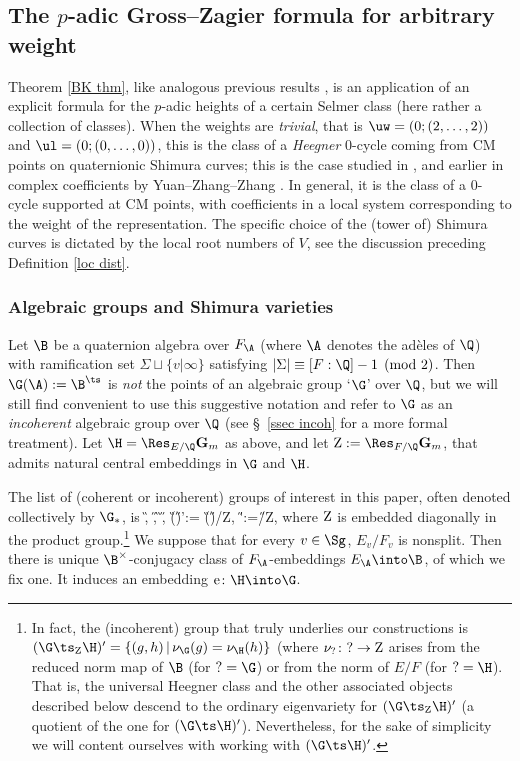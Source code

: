 \subsection{The $p$-adic Gross--Zagier formula for arbitrary weight} \label{sec: GZ}
Theorem \ref{BK thm}, like analogous previous results \cite{pr,nek-heeg,dd-ant,shnidman,dd-pyzz,nonsplit}, is an application of an explicit formula for the $p$-adic heights of a certain Selmer class (here rather a collection of classes). When the weights are \emph{trivial}, that is $\uw=(0; (2,\ldots, 2))$ and $\ul=(0; (0, \ldots, 0))$, this is the class of a \emph{Heegner} $0$-cycle coming from   CM points on quaternionic   Shimura curves; this is the case studied in \cite{dd-pyzz,nonsplit}, and earlier  in complex coefficients by Yuan--Zhang--Zhang \cite{yzz}.
 In general, it is the class of a   $0$-cycle supported at CM points,  with coefficients in a local system corresponding to the weight of the representation. The specific choice of the (tower of) Shimura curves is dictated by the local root numbers of $V$, see the discussion preceding Definition \ref{loc dist}.



\subsubsection{Algebraic groups and Shimura varieties}
Let $\B$ be a quaternion algebra over $F_{\A}$ (where $\A$ denotes the ad\`eles of $\Q$) with ramification set $\Sigma\sqcup \{v\vert \infty\} $ satisfying $|\Sigma| \equiv [F:\Q] -1\pmod{2}$.  Then $\G(\A):= \B^{\ts}$ is   \emph{not} the points of an algebraic group `$\G$' over $\Q$, but we will still find convenient to   use this  suggestive notation and   refer to  $\G$ as an \emph{incoherent} algebraic group over $\Q$ (see \S~\ref{ssec incoh} for a more formal treatment).
 Let $\H=\Res_{E/\Q}{\bf G}_{m}$ as above, and let  ${\rm Z}:= \Res_{F/\Q}{\bf G}_{m}$, that admits natural central embeddings in $\G$ and $\H$.


The list of (coherent or incoherent) groups of interest in this paper, often denoted collectively by $\G_{*}$, is
\beq \label{list}
\G, \qquad  \H, \qquad \G\times \H, \qquad (\G\times \H)':= (\G\times \H)/{\rm Z}, \qquad\H':=\H/{\rm Z},
\eeq
where ${\rm Z}$ is embedded diagonally in the product group.\footnote{In fact, the (incoherent) group that truly underlies our constructions is $(\G\ts_{\rm Z}\H)' = \{(g, h)\, | \, \nu_{\G}(g)=\nu_{\H}(h)\}$ (where $\nu_{?}\colon ?\to {\rm Z}$  arises from  the reduced norm map of $\B$ (for $?=\G$) or from the norm of $E/F$ (for $?=\H$). That is, the universal Heegner class and the other associated objects described below descend to the ordinary eigenvariety for $(\G\ts_{\rm Z}\H)'$ (a quotient of the one for $(\G\ts\H)'$). Nevertheless, for the sake of simplicity we will content ourselves with working with $(\G\ts\H)'$.}
 We suppose that for every $v\in \Sg$, $E_{v}/F_{v}$ is nonsplit. Then  there is unique $\B^{\times}$-conjugacy class of $F_{\A}$-embeddings $E_{\A}\into \B$, of which we fix one. It induces an embedding ${\rm e}\colon \H\into \G$.


